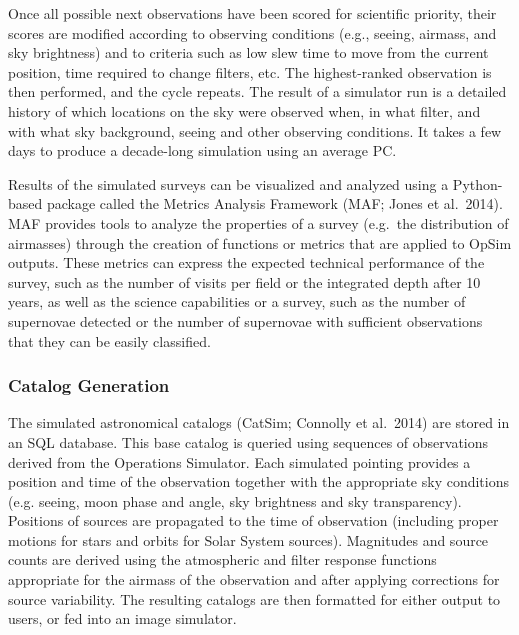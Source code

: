 {Once all possible next observations have been scored for scientific
priority, their scores are modified according to observing conditions
(e.g., seeing, airmass, and sky brightness) and to criteria such as
low slew time to move from the current position, time required to
change filters, etc. The highest-ranked observation is then performed,
and the cycle repeats. The result of a simulator run is a detailed
history of which locations on the sky were observed when, in what
filter, and with what sky background, seeing and other observing
conditions.  It takes a few days to produce a decade-long simulation
using an average PC.

Results of the simulated surveys can be visualized and analyzed using
a Python-based package called the Metrics Analysis Framework (MAF;
Jones et al.~2014). MAF provides tools to analyze the properties of a
survey (e.g.\ the distribution of airmasses) through the creation of
functions or metrics that are applied to OpSim outputs. These metrics
can express the expected technical performance of the survey, such as
the number of visits per field or the integrated depth after 10 years,
as well as the science capabilities or a survey, such as the number of
supernovae detected or the number of supernovae with sufficient
observations that they can be easily classified.

\subsubsection{Catalog Generation}
\label{sec:catalogs}

The simulated astronomical catalogs (CatSim; Connolly et al.~2014) are
stored in an SQL database. This base catalog is queried using
sequences of observations derived from the Operations Simulator. Each
simulated pointing provides a position and time of the observation
together with the appropriate sky conditions (e.g. seeing, moon phase
and angle, sky brightness and sky transparency). Positions of sources
are propagated to the time of observation (including proper motions
for stars and orbits for Solar System sources). Magnitudes and source
counts are derived using the atmospheric and filter response functions
appropriate for the airmass of the observation and after applying
corrections for source variability.  The resulting catalogs are then
formatted for either output to users, or fed into an image
simulator.

}
